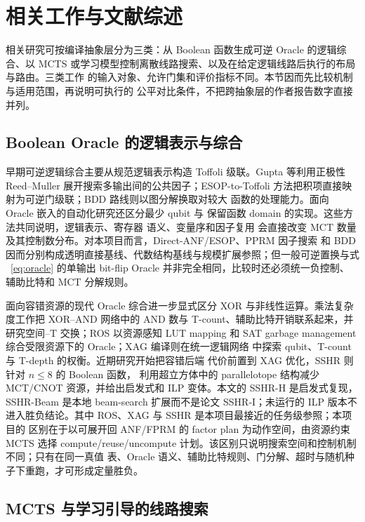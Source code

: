 \documentclass[UTF8,a4paper,12pt]{ctexart}
\begin{document}
\FloatBarrier
\section{相关工作与文献综述}
\label{sec:related}

相关研究可按编译抽象层分为三类：从 Boolean 函数生成可逆 Oracle 的逻辑综合、以
MCTS 或学习模型控制离散线路搜索、以及在给定逻辑线路后执行的布局与路由。三类工作
的输入对象、允许门集和评价指标不同。本节因而先比较机制与适用范围，再说明可执行的
公平对比条件，不把跨抽象层的作者报告数字直接并列。

\subsection{Boolean Oracle 的逻辑表示与综合}

早期可逆逻辑综合主要从规范逻辑表示构造 Toffoli 级联。Gupta 等利用正极性
Reed--Muller 展开搜索多输出间的公共因子\cite{gupta2006pprm}；ESOP-to-Toffoli
方法把积项直接映射为可逆门级联\cite{fazel2007esop}；BDD 路线则以图分解换取对较大
函数的处理能力\cite{wille2009bdd}。面向 Oracle 嵌入的自动化研究还区分最少 qubit 与
保留函数 domain 的实现\cite{henderson2023minimal}。这些方法共同说明，逻辑表示、寄存器
语义、变量序和因子复用
会直接改变 MCT 数量及其控制数分布。对本项目而言，Direct-ANF/ESOP、PPRM 因子搜索
和 BDD 因而分别构成透明直接基线、代数结构基线与规模扩展参照；但一般可逆置换与式
~\eqref{eq:oracle} 的单输出 bit-flip Oracle 并非完全相同，比较时还必须统一负控制、
辅助比特和 MCT 分解规则。

面向容错资源的现代 Oracle 综合进一步显式区分 XOR 与非线性运算。乘法复杂度工作把
XOR--AND 网络中的 AND 数与 T-count、辅助比特开销联系起来，并研究空间--T
交换\cite{meuli2019multiplicative}；ROS 以资源感知 LUT mapping 和 SAT garbage
management 综合受限资源下的 Oracle\cite{meuli2020ros}；XAG 编译则在统一逻辑网络
中探索 qubit、T-count 与 T-depth 的权衡\cite{meuli2022xag}。近期研究开始把容错后端
代价前置到 XAG 优化\cite{yu2025backend}，SSHR 则针对 $n\leq8$ 的 Boolean 函数，
利用超立方体中的 parallelotope 结构减少 MCT/CNOT 资源，并给出启发式和 ILP
变体\cite{zheng2025sshr}。本文的 SSHR-H 是启发式复现，SSHR-Beam 是本地 beam-search
扩展而不是论文 SSHR-I；未运行的 ILP 版本不进入胜负结论。其中 ROS、XAG 与 SSHR 是本项目最接近的任务级参照；本项目的
区别在于以可展开回 ANF/FPRM 的 factor plan 为动作空间，由资源约束 MCTS 选择
compute/reuse/uncompute 计划。该区别只说明搜索空间和控制机制不同；只有在同一真值
表、Oracle 语义、辅助比特规则、门分解、超时与随机种子下重跑，才可形成定量胜负。

\subsection{MCTS 与学习引导的线路搜索}
\end{document}
